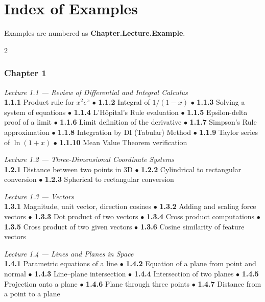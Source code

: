 \chapter*{Index of Examples}

\noindent Examples are numbered as \textbf{Chapter.Lecture.Example}.

\begin{multicols}{2}
\small

\subsection*{Chapter 1}

\noindent\textit{Lecture 1.1 --- Review of Differential and Integral Calculus}\\
\textbf{1.1.1} Product rule for $x^2 e^x$ \(\bullet\)
\textbf{1.1.2} Integral of $1/(1-x)$ \(\bullet\)
\textbf{1.1.3} Solving a system of equations \(\bullet\)
\textbf{1.1.4} L'H\^opital's Rule evaluation \(\bullet\)
\textbf{1.1.5} Epsilon-delta proof of a limit \(\bullet\)
\textbf{1.1.6} Limit definition of the derivative \(\bullet\)
\textbf{1.1.7} Simpson's Rule approximation \(\bullet\)
\textbf{1.1.8} Integration by DI (Tabular) Method \(\bullet\)
\textbf{1.1.9} Taylor series of $\ln(1+x)$ \(\bullet\)
\textbf{1.1.10} Mean Value Theorem verification

\medskip
\noindent\textit{Lecture 1.2 --- Three-Dimensional Coordinate Systems}\\
\textbf{1.2.1} Distance between two points in 3D \(\bullet\)
\textbf{1.2.2} Cylindrical to rectangular conversion \(\bullet\)
\textbf{1.2.3} Spherical to rectangular conversion

\medskip
\noindent\textit{Lecture 1.3 --- Vectors}\\
\textbf{1.3.1} Magnitude, unit vector, direction cosines \(\bullet\)
\textbf{1.3.2} Adding and scaling force vectors \(\bullet\)
\textbf{1.3.3} Dot product of two vectors \(\bullet\)
\textbf{1.3.4} Cross product computations \(\bullet\)
\textbf{1.3.5} Cross product of two given vectors \(\bullet\)
\textbf{1.3.6} Cosine similarity of feature vectors

\medskip
\noindent\textit{Lecture 1.4 --- Lines and Planes in Space}\\
\textbf{1.4.1} Parametric equations of a line \(\bullet\)
\textbf{1.4.2} Equation of a plane from point and normal \(\bullet\)
\textbf{1.4.3} Line--plane intersection \(\bullet\)
\textbf{1.4.4} Intersection of two planes \(\bullet\)
\textbf{1.4.5} Projection onto a plane \(\bullet\)
\textbf{1.4.6} Plane through three points \(\bullet\)
\textbf{1.4.7} Distance from a point to a plane


\end{multicols}
